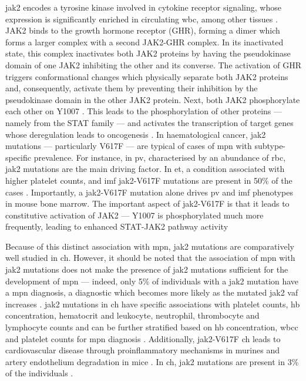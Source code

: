 \Ac{jak2} encodes a tyrosine kinase involved in cytokine receptor signaling, whose expression is significantly enriched in circulating \ac{wbc}, among other tissues \cite{Saltzman1998-wi}. JAK2 binds to the growth hormone receptor (GHR), forming a dimer which forms a larger complex with a second JAK2-GHR complex. In its inactivated state, this complex inactivates both JAK2 proteins by having the pseudokinase domain of one JAK2 inhibiting the other and its converse. The activation of GHR triggers conformational changes which physically separate both JAK2 proteins and, consequently, activate them by preventing their inhibition by the pseudokinase domain in the other JAK2 protein. Next, both JAK2 phosphorylate each other on Y1007 \cite{Brooks2014-fh}. This leads to the phosphorylation of other proteins --- namely from the STAT family --- and activates the transcription of target genes whose deregulation leads to oncogenesis \cite{Brooks2010-dc}. In haematological cancer, \ac{jak2} mutations --- particularly V617F --- are typical of cases of \ac{mpn} with subtype-specific prevalence. For instance, in \ac{pv}, characterised by an abundance of \ac{rbc}, \ac{jak2} mutations are the main driving factor. In \ac{et}, a condition associated with higher platelet counts, and \ac{imf} \ac{jak2}-V617F mutations are present in 50\% of the cases \cite{Constantinescu2008-cf}. Importantly, a \ac{jak2}-V617F mutation alone drives \ac{pv} and \ac{imf} phenotypes in mouse bone marrow. The important aspect of \ac{jak2}-V617F is that it leads to constitutive activation of JAK2 --- Y1007 is phosphorylated much more frequently, leading to enhanced STAT-JAK2 pathway activity \cite{Feng1997-jr,Constantinescu2008-cf}

Because of this distinct association with \ac{mpn}, \ac{jak2} mutations are comparatively well studied in \ac{ch}. However, it should be noted that the association of \ac{mpn} with \ac{jak2} mutations does not make the presence of \ac{jak2} mutations sufficient for the development of \ac{mpn} --- indeed, only 5\% of individuals with a \ac{jak2} mutation have a \ac{mpn} diagnosis, a diagnostic which becomes more likely as the mutated \ac{jak2} \ac{vaf} increases \cite{Cordua2019-mo}. \ac{jak2} mutations in \ac{ch} have specific associations with platelet counts, \ac{hb} concentration, hematocrit and leukocyte, neutrophil, thrombocyte and lymphocyte counts \cite{Dawoud2020-af,Cordua2019-mo} and can be further stratified based on \ac{hb} concentration, \ac{wbcc} and platelet counts for \ac{mpn} diagnosis \cite{Sochacki2019-mu,Dawoud2020-af}. Additionally, \ac{jak2}-V617F \ac{ch} leads to cardiovascular disease through proinflammatory mechanisms in murines and artery endothelium degradation in mice \cite{Sano2019-hm,Molinaro_Roberto2020-hd}. In \ac{ch}, \ac{jak2} mutations are present in 3\% of the individuals \cite{Cordua2019-mo}.

